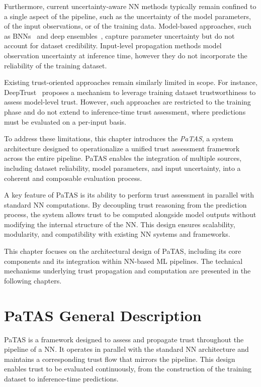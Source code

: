 Furthermore, current uncertainty-aware \ac{NN} methods typically remain confined to a single aspect of the pipeline, such as the uncertainty of the model parameters, of the input observations, or of the training data. Model-based approaches, such as \acp{BNN}~\cite{neal1996bayesian} and deep ensembles~\cite{https://doi.org/10.1002/widm.1249}, capture parameter uncertainty but do not account for dataset credibility. Input-level propagation methods model observation uncertainty at inference time, however they do not incorporate the reliability of the training dataset.

Existing trust-oriented approaches remain similarly limited in scope. For instance, DeepTrust~\cite{10.3389/frai.2020.00054} proposes a mechanism to leverage training dataset trustworthiness to assess model-level trust. However, such approaches are restricted to the training phase and do not extend to inference-time trust assessment, where predictions must be evaluated on a per-input basis.

To address these limitations, this chapter introduces the \emph{\acf{PaTAS}}, a system architecture designed to operationalize a unified trust assessment framework across the entire pipeline. \ac{PaTAS} enables the integration of multiple sources, including dataset reliability, model parameters, and input uncertainty, into a coherent and composable evaluation process.

A key feature of \ac{PaTAS} is its ability to perform trust assessment in parallel with standard \ac{NN} computations. By decoupling trust reasoning from the prediction process, the system allows trust to be computed alongside model outputs without modifying the internal structure of the \ac{NN}. This design ensures scalability, modularity, and compatibility with existing \ac{NN} systems and frameworks.

This chapter focuses on the architectural design of \ac{PaTAS}, including its core components and its integration within \ac{NN}-based \ac{ML} pipelines. The technical mechanisms underlying trust propagation and computation are presented in the following chapters.




\section{\ac{PaTAS} General Description}

\ac{PaTAS} is a framework designed to assess and propagate trust throughout the pipeline of a \ac{NN}. It operates in parallel with the standard \ac{NN} architecture and maintains a corresponding trust flow that mirrors the pipeline. This design enables trust to be evaluated continuously, from the construction of the training dataset to inference-time predictions.

